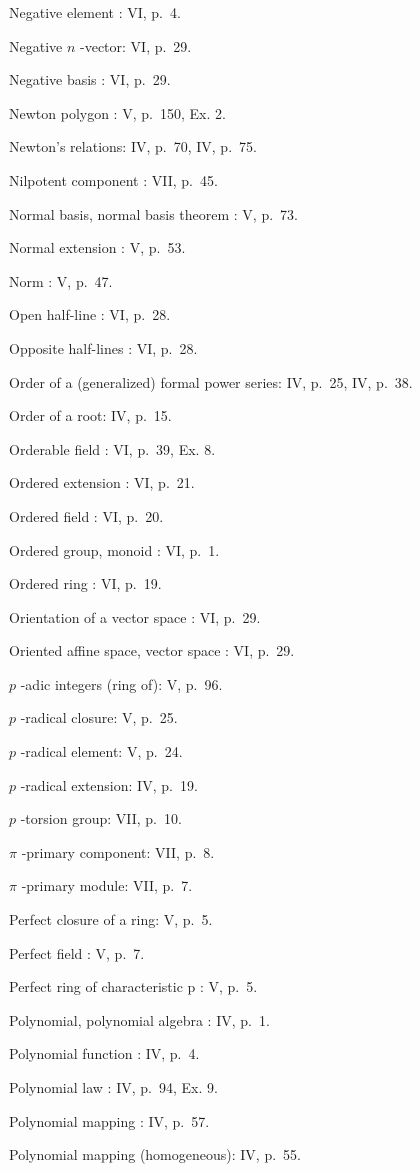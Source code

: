 Negative element : VI, p.~4.

Negative \(n\) -vector: VI, p.~29.

Negative basis : VI, p.~29.

Newton polygon : V, p.~150, Ex. 2.

Newton's relations: IV, p.~70, IV, p.~75.

Nilpotent component : VII, p.~45.

Normal basis, normal basis theorem : V, p.~73.

Normal extension : V, p.~53.

Norm : V, p.~47.

Open half-line : VI, p.~28.

Opposite half-lines : VI, p.~28.

Order of a (generalized) formal power series: IV, p.~25, IV, p.~38.

Order of a root: IV, p.~15.

Orderable field : VI, p.~39, Ex. 8.

Ordered extension : VI, p.~21.

Ordered field : VI, p.~20.

Ordered group, monoid : VI, p.~1.

Ordered ring : VI, p.~19.

Orientation of a vector space : VI, p.~29.

Oriented affine space, vector space : VI, p.~29.

\(p\) -adic integers (ring of): V, p.~96.

\(p\) -radical closure: V, p.~25.

\(p\) -radical element: V, p.~24.

\(p\) -radical extension: IV, p.~19.

\(p\) -torsion group: VII, p.~10.

\(\pi\) -primary component: VII, p.~8.

\(\pi\) -primary module: VII, p.~7.

Perfect closure of a ring: V, p.~5.

Perfect field : V, p.~7.

Perfect ring of characteristic p : V, p.~5.

Polynomial, polynomial algebra : IV, p.~1.

Polynomial function : IV, p.~4.

Polynomial law : IV, p.~94, Ex. 9.

Polynomial mapping : IV, p.~57.

Polynomial mapping (homogeneous): IV, p.~55.

